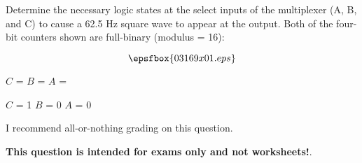 

Determine the necessary logic states at the select inputs of the multiplexer (A, B, and C) to cause a 62.5 Hz square wave to appear at the output.  Both of the four-bit counters shown are full-binary (modulus = 16):

$$\epsfbox{03169x01.eps}$$

$C$ = \hskip 30pt $B$ = \hskip 30pt $A$ =







$C$ = 1 \hskip 30pt $B$ = 0 \hskip 30pt $A$ = 0

\vskip 10pt

I recommend all-or-nothing grading on this question.







{\bf This question is intended for exams only and not worksheets!}.




